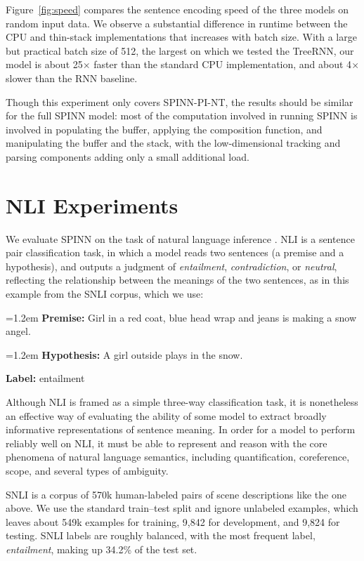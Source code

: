 \documentclass[11pt]{article}
\newcommand{\snli}[3]{{\vspace{0.25em}
{\small \setlength{\parindent}{0.6em} \hangindent=1.2em  \textbf{Premise:} #1\par}\vspace{0.25em}
{\small \setlength{\parindent}{0.6em} \hangindent=1.2em   \textbf{Hypothesis:} #2\par}\vspace{0.25em}
{\small \setlength{\parindent}{0.6em}  \textbf{Label:} #3\par}
}}
\begin{document}
Figure~\ref{fig:speed} compares the sentence encoding speed of the three models on random input data. We observe a substantial difference in runtime between the CPU and thin-stack implementations that increases with batch size. With a large but practical batch size of 512, the largest on which we tested the TreeRNN, our model is about 25$\times$ faster than the standard CPU implementation, and about 4$\times$ slower than the RNN baseline.

Though this experiment only covers SPINN-PI-NT, the results should be similar for the full SPINN model: most of the computation involved in running SPINN is involved in populating the buffer, applying the composition function, and manipulating the buffer and the stack, with the low-dimensional tracking and parsing components adding only a small additional load.

\section{NLI Experiments}

We evaluate SPINN on the task of natural language inference \citep[NLI, a.k.a.\ recognizing textual entailment, or RTE;][]{dagan2006pascal}. NLI is a sentence pair classification task, in which a model reads two sentences (a premise and a hypothesis), and outputs a judgment of {\it entailment}, {\it contradiction}, or {\it neutral}, reflecting the relationship between the meanings of the two sentences, as in this example from the SNLI corpus, which we use:

\snli{Girl in a red coat, blue head wrap and jeans is making a snow angel.}
{A girl outside plays in the snow.}
{entailment}

Although NLI is framed as a simple three-way classification task, it is nonetheless an effective way of evaluating the ability of some model to extract broadly informative representations of sentence meaning. In order for a model to perform reliably well on NLI, it must be able to represent and reason with the core phenomena of natural language semantics, including quantification, coreference, scope, and several types of ambiguity.

SNLI is a corpus of 570k human-labeled pairs of scene descriptions like the one above. We use the standard train--test split and ignore unlabeled examples, which leaves about 549k examples for training, 9,842 for development, and 9,824 for testing. SNLI labels are roughly balanced, with the most frequent label, {\it entailment}, making up 34.2\% of the test set.
\end{document}

